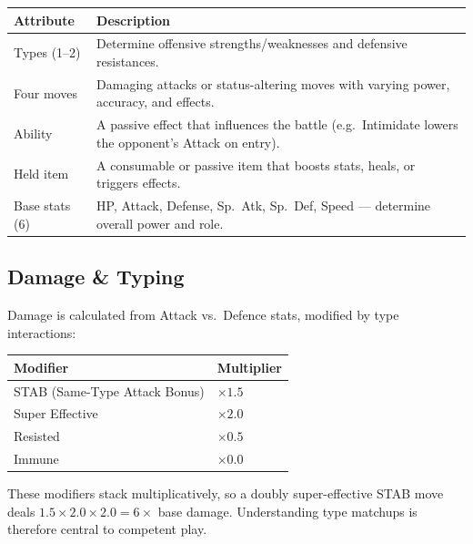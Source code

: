 \begin{center}
\small
\begin{tabularx}{\textwidth}{l X}
  \toprule
  \textbf{Attribute} & \textbf{Description} \\
  \midrule
  Types (1--2)        & Determine offensive strengths/weaknesses and
                        defensive resistances. \\
  Four moves          & Damaging attacks or status-altering moves with
                        varying power, accuracy, and effects. \\
  Ability             & A passive effect that influences the battle
                        (e.g.\ Intimidate lowers the opponent's Attack on
                        entry). \\
  Held item           & A consumable or passive item that boosts stats,
                        heals, or triggers effects. \\
  Base stats (6)      & HP, Attack, Defense, Sp.\ Atk, Sp.\ Def, Speed ---
                        determine overall power and role. \\
  \bottomrule
\end{tabularx}
\end{center}

\subsection{Damage \& Typing}

Damage is calculated from Attack vs.\ Defence stats, modified by type
interactions:

\begin{center}
\small
\begin{tabularx}{0.8\textwidth}{l l}
  \toprule
  \textbf{Modifier} & \textbf{Multiplier} \\
  \midrule
  STAB (Same-Type Attack Bonus) & $\times 1.5$ \\
  Super Effective               & $\times 2.0$ \\
  Resisted                      & $\times 0.5$ \\
  Immune                        & $\times 0.0$ \\
  \bottomrule
\end{tabularx}
\end{center}

These modifiers stack multiplicatively, so a doubly super-effective STAB move
deals $1.5 \times 2.0 \times 2.0 = 6\times$ base damage.  Understanding type
matchups is therefore central to competent play.


